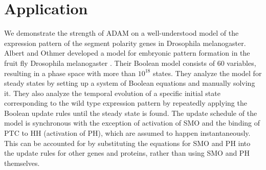 \documentclass[11pt]{amsart}
\begin{document}
\section{Application} \label{benchmarks}
We demonstrate the strength of ADAM on a well-understood model of the expression
pattern of the segment polarity genes in Drosophila melanogaster. Albert and Othmer developed a model for embryonic pattern formation in the fruit fly Drosophila melanogaster \cite{AO}. Their Boolean
model consists of 60 variables, resulting in a phase
space with more than $10^{18}$ states. They analyze the model for steady states by setting up a system of Boolean equations and manually solving it. They also analyze the temporal evolution of a specific initial state corresponding to the wild type expression pattern by repeatedly applying the Boolean update rules until the steady state is found. The update schedule of the model is synchronous  with the exception of activation of SMO and the binding of PTC to HH (activation of PH), which are assumed to happen instantaneously. This can be accounted for by substituting the equations for SMO and PH into the update rules for other genes and proteins, rather than using SMO and PH themselves.
\end{document}

